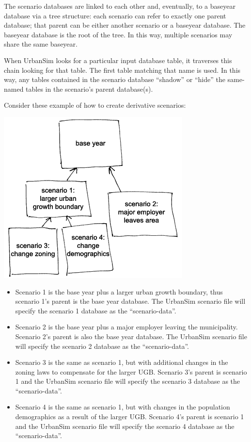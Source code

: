 The scenario databases are linked to each other and, eventually, to a baseyear
database via a tree structure: each scenario can refer to exactly one parent
database; that parent can be either another scenario or a baseyear database.
The baseyear database is the root of the tree.  In this way, multiple scenarios
may share the same baseyear.

When UrbanSim looks for a particular input database table, it traverses this
chain looking for that table.  The first table matching that name is used.  In
this way, any tables contained in the scenario database ``shadow'' or ``hide''
the same-named tables in the scenario's parent database(s).

Consider these example of how to create derivative scenarios:\\

\begin{center}
\includegraphics*{scenarios}
\end{center}

\begin{itemize}
\item Scenario 1 is the base year plus a larger urban growth boundary, thus
scenario 1's parent is the base year database. The UrbanSim scenario file will
specify the scenario 1 database as the ``scenario-data''.
\item Scenario 2 is the base year plus a major employer leaving the
municipality. Scenario 2's parent is also the base year database. The UrbanSim
scenario file will specify the scenario 2 database as the ``scenario-data''.
\item Scenario 3 is the same as scenario 1, but with additional changes in the
zoning laws to compensate for the larger UGB. Scenario 3's parent is scenario 1
and the UrbanSim scenario file will specify the scenario 3 database as the
``scenario-data''.
\item Scenario 4 is the same as scenario 1, but with changes in the population
demographics as a result of the larger UGB. Scenario 4's parent is scenario 1
and the UrbanSim scenario file will specify the scenario 4 database as the
``scenario-data''.
\end{itemize}

